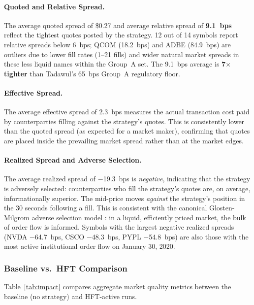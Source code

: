 \documentclass[12pt]{article}
\begin{document}
\paragraph{Quoted and Relative Spread.}
The average quoted spread of \$0.27 and average relative spread of
\textbf{9.1~bps} reflect the tightest quotes posted by the strategy.
12 out of 14 symbols report relative spreads below 6~bps; QCOM
(18.2~bps) and ADBE (84.9~bps) are outliers due to lower fill rates
(1--21 fills) and wider natural market spreads in these less liquid
names within the Group~A set. The 9.1~bps average is \textbf{7$\times$
tighter} than Tadawul's 65~bps Group~A regulatory floor.

\paragraph{Effective Spread.}
The average effective spread of 2.3~bps measures the actual
transaction cost paid by counterparties filling against the strategy's
quotes. This is consistently lower than the quoted spread (as expected
for a market maker), confirming that quotes are placed inside the
prevailing market spread rather than at the market edges.

\paragraph{Realized Spread and Adverse Selection.}
The average realized spread of $-$19.3~bps is \textit{negative},
indicating that the strategy is adversely selected: counterparties who
fill the strategy's quotes are, on average, informationally superior.
The mid-price moves \textit{against} the strategy's position in the
30 seconds following a fill. This is consistent with the canonical
Glosten-Milgrom adverse selection model \cite{glosten1985}: in a
liquid, efficiently priced market, the bulk of order flow is informed.
Symbols with the largest negative realized spreads (NVDA $-$64.7~bps,
CSCO $-$48.3~bps, PYPL $-$54.8~bps) are also those with the most
active institutional order flow on January 30, 2020.

\subsubsection*{Baseline vs.\ HFT Comparison}

Table~\ref{tab:impact} compares aggregate market quality metrics
between the baseline (no strategy) and HFT-active runs.
\end{document}
